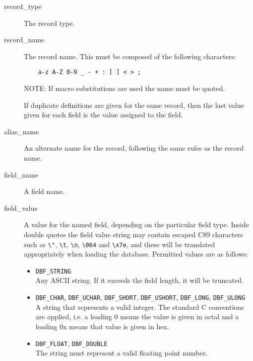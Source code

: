 \begin{description}
\item [record\_type] The record type.

\item [record\_name] The record name.
This must be composed of the following characters:

\begin{verbatim}
    a-z A-Z 0-9 _ - + : [ ] < > ;
\end{verbatim}

NOTE: If macro substitutions are used the name must be quoted.

If duplicate definitions are given for the same record, then the last value given for each field is the value assigned 
to the field.

\item [alias\_name] An alternate name for the record, following the same rules as the record name.

\item [field\_name] A field name.

\item [field\_value] A value for the named field, depending on the particular field type.
Inside double quotes the field value string may contain escaped C89 characters such as 
\verb|\"|, \verb|\t|, \verb|\n|, \verb|\064| and \verb|\x7e|, and these will be translated appropriately when loading the database.
Permitted values are as follows:

\begin{itemize}
\item \verb|DBF_STRING| \\
Any ASCII string. If it exceeds the field length, it will be truncated.

\item \verb|DBF_CHAR|, \verb|DBF_UCHAR|, \verb|DBF_SHORT|, \verb|DBF_USHORT|, \verb|DBF_LONG|, \verb|DBF_ULONG| \\
A string that represents a valid integer. The standard C conventions are applied, i.e. a leading 0 means the 
value is given in octal and a leading 0x means that value is given in hex.

\item \verb|DBF_FLOAT|, \verb|DBF_DOUBLE| \\
The string must represent a valid floating point number.


\end{itemize}
\end{description}

